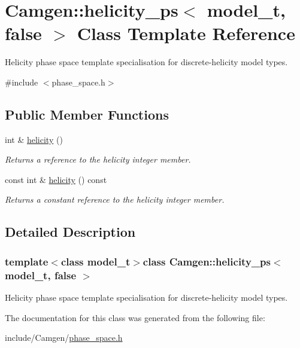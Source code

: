 \hypertarget{a00273}{\section{Camgen\-:\-:helicity\-\_\-ps$<$ model\-\_\-t, false $>$ Class Template Reference}
\label{a00273}
}


Helicity phase space template specialisation for discrete-\/helicity model types.  




{\ttfamily \#include $<$phase\-\_\-space.\-h$>$}

\subsection*{Public Member Functions}
\begin{DoxyCompactItemize}
\item 
\hypertarget{a00273_a30035e4fc32fe666019a33379687585f}{int \& \hyperlink{a00273_a30035e4fc32fe666019a33379687585f}{helicity} ()}\label{a00273_a30035e4fc32fe666019a33379687585f}

\begin{DoxyCompactList}\small\item\em Returns a reference to the helicity integer member. \end{DoxyCompactList}\item 
\hypertarget{a00273_af69a86b9a4a4f9a9998451e4030dee10}{const int \& \hyperlink{a00273_af69a86b9a4a4f9a9998451e4030dee10}{helicity} () const }\label{a00273_af69a86b9a4a4f9a9998451e4030dee10}

\begin{DoxyCompactList}\small\item\em Returns a constant reference to the helicity integer member. \end{DoxyCompactList}\end{DoxyCompactItemize}


\subsection{Detailed Description}
\subsubsection*{template$<$class model\-\_\-t$>$class Camgen\-::helicity\-\_\-ps$<$ model\-\_\-t, false $>$}

Helicity phase space template specialisation for discrete-\/helicity model types. 



The documentation for this class was generated from the following file\-:\begin{DoxyCompactItemize}
\item 
include/\-Camgen/\hyperlink{a00694}{phase\-\_\-space.\-h}\end{DoxyCompactItemize}

